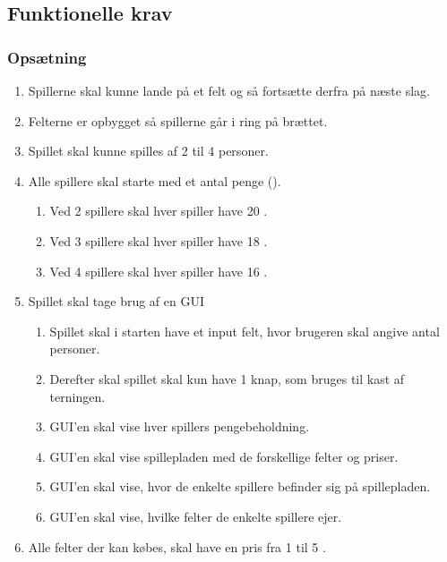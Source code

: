 \subsection{Funktionelle krav}
\subsubsection{Opsætning}
\begin{enumerate}
  \item Spillerne skal kunne lande på et felt og så fortsætte derfra på næste slag. 
  \item Felterne er opbygget så spillerne går i ring på brættet.
  \item Spillet skal kunne spilles af 2 til 4 personer.
  \item Alle spillere skal starte med et antal penge ({}).
  
  \begin{enumerate}
      \item Ved 2 spillere skal hver spiller have 20 {}.
      \item Ved 3 spillere skal hver spiller have 18 {}.
      \item Ved 4 spillere skal hver spiller have 16 {}.
  \end{enumerate}
  
  \item Spillet skal tage brug af en GUI
  \begin{enumerate}
      \item Spillet skal i starten have et input felt, hvor brugeren skal angive antal personer.
      \item Derefter skal spillet skal kun have 1 knap, som bruges til kast af terningen.
      \item GUI'en skal vise hver spillers pengebeholdning.
      \item GUI'en skal vise spillepladen med de forskellige felter og priser.
      \item GUI'en skal vise, hvor de enkelte spillere befinder sig på spillepladen.
      \item GUI'en skal vise, hvilke felter de enkelte spillere ejer.
  \end{enumerate}
  \item Alle felter der kan købes, skal have en pris fra 1 til 5 {}.
\end{enumerate}




